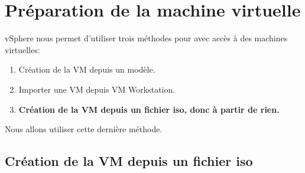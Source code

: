 	\section{Préparation de la machine virtuelle }
	
	vSphere nous permet d'utiliser trois méthodes pour avec accès à des machines virtuelles:
	\begin{enumerate}
		\item Création de la VM depuis un modèle. 
		\item Importer une VM depuis VM Workstation.
		\item \textbf{Création de la VM depuis un fichier iso, donc à partir de rien.}
	\end{enumerate}
	Nous allons utiliser cette dernière méthode.
	\subsection {Création de la VM depuis un fichier iso}
	
